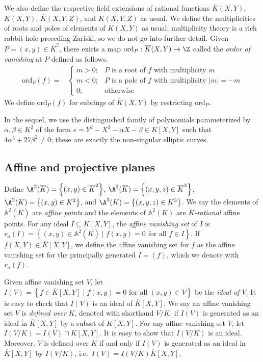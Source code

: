 \documentclass[11pt,letterpaper]{article}
\theoremstyle{definition}
\newcommand{\6}{\mathbf}
\newcommand{\7}{\mathcal}
\begin{document}
We also define the respective field extensions of rational functions $\overline{K}(X,Y)$, $K(X,Y)$, $\overline{K}(X,Y,Z)$, and $K(X,Y,Z)$ as usual. We define the multiplicities of roots and poles of elements of $K(X,Y)$ as usual; multiplicity theory is a rich rabbit hole preceding Zariski, so we do not go into further detail.
Given $P = (x,y) \in \overline{K}^2$, there exists a map $\text{ord}_P:\overline{K}(X,Y) \to \Z$ called the \textit{order of vanishing} at $P$ defined as follows.
\begin{align}
\text{ord}_P(f) =& \begin{cases} m > 0; & P\text{ is a root of }f\text{ with multiplicity }m \\ m < 0; & P\text{ is a pole of }f\text{ with multiplicity }\left|m\right|=-m \\ 0; & \text{otherwise} \end{cases}
\end{align} We define $\text{ord}_P(f)$ for subrings of $\overline{K}(X,Y)$ by restricting $\text{ord}_P$.

In the sequel, we use the distinguished family of polynomials parameterized by $\alpha, \beta \in K^2$ of the form $e = Y^2 - X^3 - \alpha X - \beta \in K[X,Y]$ such that $4\alpha^3 + 27\beta^2 \neq 0$; these are exactly the non-singular elliptic curves.

\subsection{Affine and projective planes}

Define $\A^2(\overline{K}) = \left\{(x,y) \in \overline{K}^2\right\}$, $\A^3(\overline{K}) = \left\{(x,y,z) \in \overline{K}^3\right\}$, $\A^2(K) = \left\{(x,y) \in K^2\right\}$, and $\A^3(K)=\left\{(x,y,z) \in K^3\right\}$.  We say the elements of $\mathbb{A}^2(\overline{K})$ are \textit{affine points} and the elements of $\mathbb{A}^2(K)$ are \textit{$K$-rational} affine points. 
For any ideal $I \subseteq \overline{K}[X,Y]$, the \textit{affine vanishing set} of $I$ is  $v_a(I) = \left\{(x,y) \in \mathbb{A}^2(\overline{K}) \mid f(x,y) = 0\text{ for all } f \in I\right\}$. If $f(X,Y) \in \overline{K}[X,Y]$, we define the affine vanishing set for $f$ as the affine vanishing set for the principally generated $I = (f)$, which we denote with $v_a(f)$.


Given affine vanishing set $V$, let $I(V) = \left\{f \in \overline{K}[X,Y] \mid f(x,y) = 0\text{ for all }(x,y) \in V\right\}$  be the \textit{ideal of $V$}. It is easy to check that $I(V)$ is an ideal of $\overline{K}[X,Y]$.
We say an affine vanishing set $V$ is \textit{defined over} $K$, denoted with shorthand $V/K$, if $I(V)$ is generated as an ideal in $\overline{K}[X,Y]$ by a subset of $K[X,Y]$. 
For any affine vanishing set $V$, let $I(V/K) = I(V) \cap K[X,Y]$. It is easy to show that $I(V/K)$ is an ideal. Moreover, $V$ is defined over $K$ if and only if $I(V)$ is generated as an ideal in $\overline{K}[X,Y]$ by $I(V/K)$, i.e.\ $I(V) = I(V/K)\overline{K}[X,Y]$. 
\end{document}

